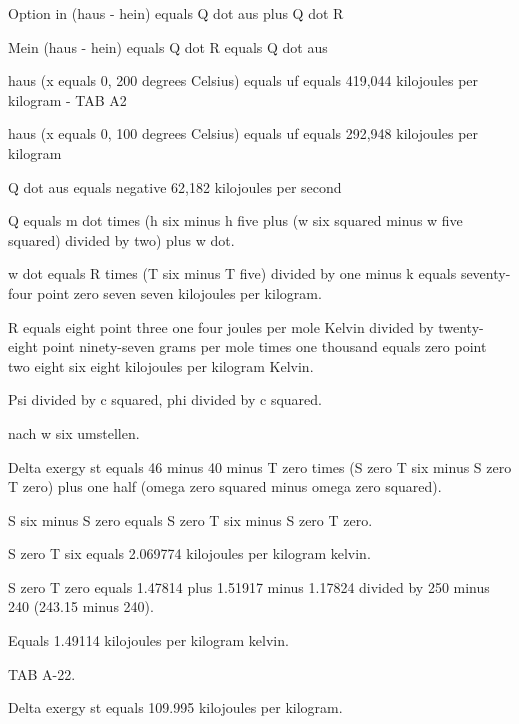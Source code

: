 Option in (haus - hein) equals Q dot aus plus Q dot R

Mein (haus - hein) equals Q dot R equals Q dot aus

haus (x equals 0, 200 degrees Celsius) equals uf equals 419,044 kilojoules per kilogram - TAB A2

haus (x equals 0, 100 degrees Celsius) equals uf equals 292,948 kilojoules per kilogram

Q dot aus equals negative 62,182 kilojoules per second

Q equals m dot times (h six minus h five plus (w six squared minus w five squared) divided by two) plus w dot.

w dot equals R times (T six minus T five) divided by one minus k equals seventy-four point zero seven seven kilojoules per kilogram.

R equals eight point three one four joules per mole Kelvin divided by twenty-eight point ninety-seven grams per mole times one thousand equals zero point two eight six eight kilojoules per kilogram Kelvin.

Psi divided by c squared, phi divided by c squared.

nach w six umstellen.

Delta exergy st equals 46 minus 40 minus T zero times (S zero T six minus S zero T zero) plus one half (omega zero squared minus omega zero squared).

S six minus S zero equals S zero T six minus S zero T zero.

S zero T six equals 2.069774 kilojoules per kilogram kelvin.

S zero T zero equals 1.47814 plus 1.51917 minus 1.17824 divided by 250 minus 240 (243.15 minus 240).

Equals 1.49114 kilojoules per kilogram kelvin.

TAB A-22.

Delta exergy st equals 109.995 kilojoules per kilogram.